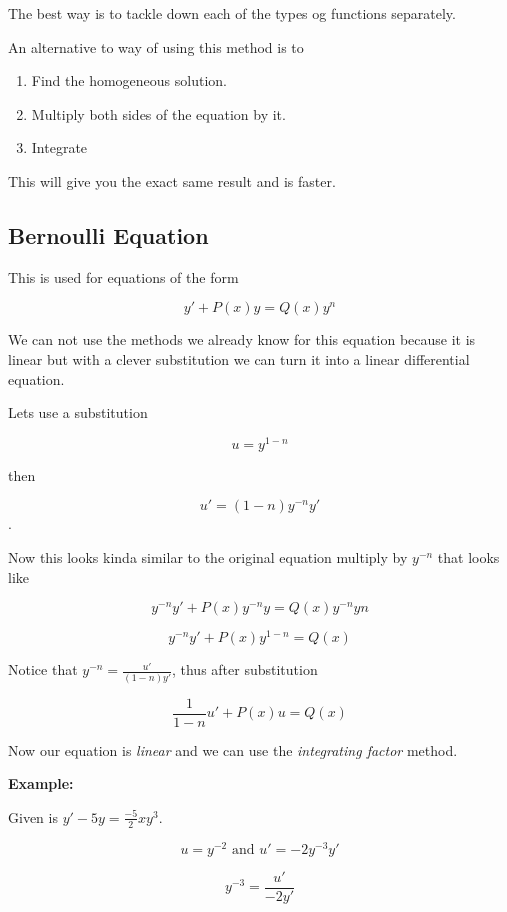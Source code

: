 The best way is to tackle down each of the types og functions separately.
\vspace{\baselineskip}

An alternative to way of using this method is to
\begin{enumerate}
    \item Find the homogeneous solution.
    \item Multiply both sides of the equation by it.
    \item Integrate
\end{enumerate}

This will give you the exact same result and is faster.

\subsection{Bernoulli Equation}

This is used for equations of the form 

\[
y' + P(x)y = Q(x)y^n
\]

We can not use the methods we already know for this equation because it is linear but with a
clever substitution we can turn it into a linear differential equation.
\vspace{\baselineskip}

Lets use a substitution 

\[u = y^{1 - n}\] 

then 

\[u' = (1 - n)y^{-n} y'\]. 

Now this 
looks kinda similar to the original equation multiply by \(y^{-n}\) that looks like

\[
y^{-n}y' + P(x)y^{-n}y = Q(x)y^{-n}y{n}
\]

\[
y^{-n}y' + P(x)y^{1 - n} = Q(x)
\]


Notice that \(y^{-n} = \frac{u'}{(1-n)y'}\), thus after substitution

\[
\frac{1}{1 - n}u' + P(x)u = Q(x)
\]

Now our equation is \emph{linear} and we can use the \emph{integrating factor} method.
\vspace{\baselineskip}

\textbf{Example: }
\vspace{\baselineskip}

Given is \(y' -5y = \frac{-5}{2}xy^3\).

\[
u = y^{-2}  \text{ and } u' = -2y^{-3}y'
\]

\[
y^{-3} = \frac{u'}{-2y'}
\]

